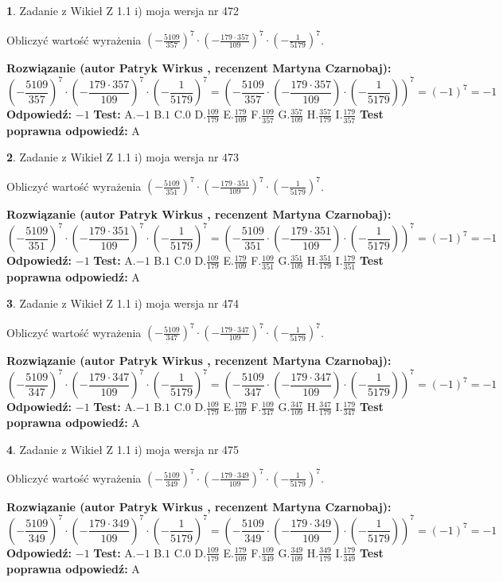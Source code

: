 \documentclass[12pt, a4paper]{article}
\theoremstyle{definition} %
\newtheorem{zad}{}
\newcommand{\zadStart}[1]{\begin{zad}#1\newline}
\newcommand{\zadStop}{\end{zad}}
\newcommand{\rozwStart}[2]{\noindent \textbf{Rozwiązanie (autor #1 , recenzent #2): }\newline}
\newcommand{\rozwStop}{\newline}
\newcommand{\odpStart}{\noindent \textbf{Odpowiedź:}\newline}
\newcommand{\odpStop}{\newline}
\newcommand{\testStart}{\noindent \textbf{Test:}\newline}
\newcommand{\testStop}{\newline}
\newcommand{\kluczStart}{\noindent \textbf{Test poprawna odpowiedź:}\newline}
\newcommand{\kluczStop}{\newline}
\begin{document}
\zadStart{Zadanie z Wikieł Z 1.1 i) moja wersja nr 472}

Obliczyć wartość wyrażenia $(-\frac{5109}{357})^{7} \cdot (-\frac{179 \cdot 357}{109})^{7} \cdot (-\frac{1}{5179})^{7}$.
\zadStop
\rozwStart{Patryk Wirkus}{Martyna Czarnobaj}
$$(-\frac{5109}{357})^{7} \cdot (-\frac{179 \cdot 357}{109})^{7} \cdot (-\frac{1}{5179})^{7} = (-\frac{5109}{357} \cdot (-\frac{179 \cdot 357}{109}) \cdot (-\frac{1}{5179}))^{7} = (-1)^{7} = -1$$
\rozwStop
\odpStart
$-1$
\odpStop
\testStart
A.$-1$ B.$1$ C.$0$ D.$\frac{109}{179}$ E.$\frac{179}{109}$
F.$\frac{109}{357}$ G.$\frac{357}{109}$
H.$\frac{357}{179}$
I.$\frac{179}{357}$
\testStop
\kluczStart
A
\kluczStop



\zadStart{Zadanie z Wikieł Z 1.1 i) moja wersja nr 473}

Obliczyć wartość wyrażenia $(-\frac{5109}{351})^{7} \cdot (-\frac{179 \cdot 351}{109})^{7} \cdot (-\frac{1}{5179})^{7}$.
\zadStop
\rozwStart{Patryk Wirkus}{Martyna Czarnobaj}
$$(-\frac{5109}{351})^{7} \cdot (-\frac{179 \cdot 351}{109})^{7} \cdot (-\frac{1}{5179})^{7} = (-\frac{5109}{351} \cdot (-\frac{179 \cdot 351}{109}) \cdot (-\frac{1}{5179}))^{7} = (-1)^{7} = -1$$
\rozwStop
\odpStart
$-1$
\odpStop
\testStart
A.$-1$ B.$1$ C.$0$ D.$\frac{109}{179}$ E.$\frac{179}{109}$
F.$\frac{109}{351}$ G.$\frac{351}{109}$
H.$\frac{351}{179}$
I.$\frac{179}{351}$
\testStop
\kluczStart
A
\kluczStop



\zadStart{Zadanie z Wikieł Z 1.1 i) moja wersja nr 474}

Obliczyć wartość wyrażenia $(-\frac{5109}{347})^{7} \cdot (-\frac{179 \cdot 347}{109})^{7} \cdot (-\frac{1}{5179})^{7}$.
\zadStop
\rozwStart{Patryk Wirkus}{Martyna Czarnobaj}
$$(-\frac{5109}{347})^{7} \cdot (-\frac{179 \cdot 347}{109})^{7} \cdot (-\frac{1}{5179})^{7} = (-\frac{5109}{347} \cdot (-\frac{179 \cdot 347}{109}) \cdot (-\frac{1}{5179}))^{7} = (-1)^{7} = -1$$
\rozwStop
\odpStart
$-1$
\odpStop
\testStart
A.$-1$ B.$1$ C.$0$ D.$\frac{109}{179}$ E.$\frac{179}{109}$
F.$\frac{109}{347}$ G.$\frac{347}{109}$
H.$\frac{347}{179}$
I.$\frac{179}{347}$
\testStop
\kluczStart
A
\kluczStop



\zadStart{Zadanie z Wikieł Z 1.1 i) moja wersja nr 475}

Obliczyć wartość wyrażenia $(-\frac{5109}{349})^{7} \cdot (-\frac{179 \cdot 349}{109})^{7} \cdot (-\frac{1}{5179})^{7}$.
\zadStop
\rozwStart{Patryk Wirkus}{Martyna Czarnobaj}
$$(-\frac{5109}{349})^{7} \cdot (-\frac{179 \cdot 349}{109})^{7} \cdot (-\frac{1}{5179})^{7} = (-\frac{5109}{349} \cdot (-\frac{179 \cdot 349}{109}) \cdot (-\frac{1}{5179}))^{7} = (-1)^{7} = -1$$
\rozwStop
\odpStart
$-1$
\odpStop
\testStart
A.$-1$ B.$1$ C.$0$ D.$\frac{109}{179}$ E.$\frac{179}{109}$
F.$\frac{109}{349}$ G.$\frac{349}{109}$
H.$\frac{349}{179}$
I.$\frac{179}{349}$
\testStop
\kluczStart
A
\kluczStop
\end{document}
